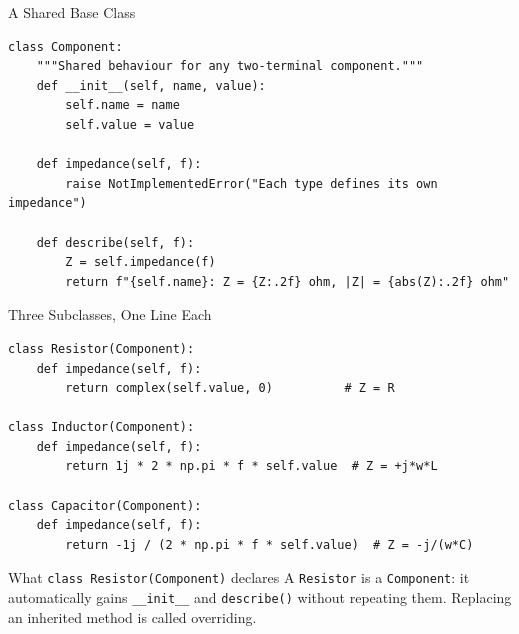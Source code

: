 \documentclass[9pt,aspectratio=169,xcolor=table]{beamer}
\begin{document}
\begin{frame}[fragile]{A Shared Base Class}
    \leavevmode
\begin{lstlisting}
class Component:
    """Shared behaviour for any two-terminal component."""
    def __init__(self, name, value):
        self.name = name
        self.value = value

    def impedance(self, f):
        raise NotImplementedError("Each type defines its own impedance")

    def describe(self, f):
        Z = self.impedance(f)
        return f"{self.name}: Z = {Z:.2f} ohm, |Z| = {abs(Z):.2f} ohm"
\end{lstlisting}
\end{frame}

\begin{frame}[fragile]{Three Subclasses, One Line Each}
    \leavevmode
\begin{lstlisting}
class Resistor(Component):
    def impedance(self, f):
        return complex(self.value, 0)          # Z = R

class Inductor(Component):
    def impedance(self, f):
        return 1j * 2 * np.pi * f * self.value  # Z = +j*w*L

class Capacitor(Component):
    def impedance(self, f):
        return -1j / (2 * np.pi * f * self.value)  # Z = -j/(w*C)
\end{lstlisting}

    \vspace{2mm}
    \begin{block}{What \texttt{class Resistor(Component)} declares}
        A \texttt{Resistor} \alert{is a} \texttt{Component}: it
        automatically gains \texttt{\_\_init\_\_} and \texttt{describe()}
        without repeating them. Replacing an inherited method is called
        \alert{overriding}.
    \end{block}
\end{frame}
\end{document}
